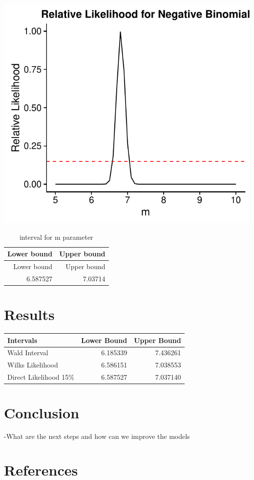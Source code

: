\documentclass[11pt,preprint, authoryear]{elsarticle}
\let\origtable\table
\let\endorigtable\endtable
\renewenvironment{table}[1][2] {
    \expandafter\origtable\expandafter[H]
} {
    \endorigtable
}
\numberwithin{equation}{section}
\numberwithin{figure}{section}
\numberwithin{table}{section}
\begin{document}
\includegraphics{likelihood_files/figure-latex/unnamed-chunk-6-1.pdf}

\begin{longtable}[]{@{}rr@{}}
\caption{interval for m parameter}\tabularnewline
\toprule
Lower bound & Upper bound\tabularnewline
\midrule
\endfirsthead
\toprule
Lower bound & Upper bound\tabularnewline
\midrule
\endhead
6.587527 & 7.03714\tabularnewline
\bottomrule
\end{longtable}

\section{Results}\label{results}

\begin{table}

\caption{\label{tab:intervals}Intervals for m parameter}
\centering
\begin{tabular}[t]{lrr}
\toprule
Intervals & Lower Bound & Upper Bound\\
\midrule
Wald Interval & 6.185339 & 7.436261\\
Wilks Likelihood & 6.586151 & 7.038553\\
Direct Likelihood 15\% & 6.587527 & 7.037140\\
\bottomrule
\end{tabular}
\end{table}

\section{Conclusion}\label{conclusion}

-What are the next steps and how can we improve the models

\section{References}\label{references}

\newpage
\nocite{*}

\end{document}
